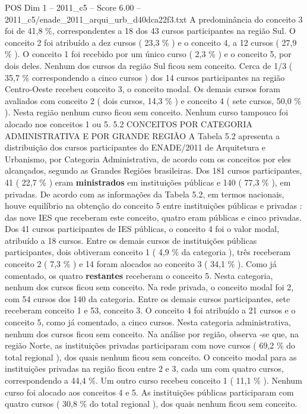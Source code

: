 \begin{textsample}{POS Dim 1 – 2011\_c5 – Score 6.00 – 2011\_c5/enade\_2011\_arqui\_urb\_d40dca22f3.txt}
A predominância do conceito 3 foi de 41,8 \%, correspondentes a 18 dos 43 cursos participantes na região Sul.
O conceito 2 foi atribuído a dez cursos ( 23,3 \% ) e o conceito 4, a 12 cursos ( 27,9 \% ).
O conceito 1 foi recebido por um único curso ( 2,3 \% ) e o conceito 5, por dois deles.
Nenhum dos cursos da região Sul ficou sem conceito.
Cerca de 1/3 ( 35,7 \% correspondendo a cinco cursos ) dos 14 cursos participantes na região Centro-Oeste recebeu conceito 3, o conceito modal.
Os demais cursos foram avaliados com conceito 2 ( dois cursos, 14,3 \% ) e conceito 4 ( sete cursos, 50,0 \% ).
Nesta região nenhum curso ficou sem conceito.
Nenhum curso tampouco foi alocado nos conceitos 1 ou 5. 5.2 CONCEITOS POR CATEGORIA ADMINISTRATIVA E POR GRANDE REGIÃO A Tabela 5.2 apresenta a distribuição dos cursos participantes do ENADE/2011 de Arquitetura e Urbanismo, por Categoria Administrativa, de acordo com os conceitos por eles alcançados, segundo as Grandes Regiões brasileiras.
Dos 181 cursos participantes, 41 ( 22,7 \% ) eram \textbf{ministrados} em instituições públicas e 140 ( 77,3 \% ), em privadas.
De acordo com as informações da Tabela 5.2, em termos nacionais, houve equilíbrio na obtenção do conceito 5 entre instituições públicas e privadas : das nove IES que receberam este conceito, quatro eram públicas e cinco privadas.
Dos 41 cursos participantes de IES públicas, o conceito 4 foi o valor modal, atribuído a 18 cursos.
Entre os demais cursos de instituições públicas participantes, dois obtiveram conceito 1 ( 4,9 \% da categoria ), três receberam conceito 2 ( 7,3 \% ) e 14 foram alocados ao conceito 3 ( 34,1 \% ).
Como já comentado, os quatro \textbf{restantes} receberam o conceito 5.
Nesta categoria, nenhum dos cursos ficou sem conceito.
Na rede privada, o conceito modal foi 2, com 54 cursos dos 140 da categoria.
Entre os demais cursos participantes, sete receberam conceito 1 e 53, conceito 3.
O conceito 4 foi atribuído a 21 cursos e o conceito 5, como já comentado, a cinco cursos.
Nesta categoria administrativa, nenhum dos cursos ficou sem conceito.
Na análise por região, observa -se que, na região Norte, as instituições privadas participaram com nove cursos ( 69,2 \% do total regional ), dos quais nenhum ficou sem conceito.
O conceito modal para as instituições privadas na região ficou entre 2 e 3, cada um com quatro cursos, correspondendo a 44,4 \%.
Um outro curso recebeu conceito 1 ( 11,1 \% ).
Nenhum curso foi alocado aos conceitos 4 e 5.
As instituições públicas participaram com quatro cursos ( 30,8 \% do total regional ), dos quais nenhum ficou sem conceito.

\end{textsample}
